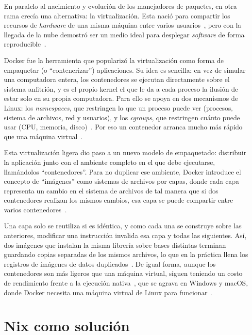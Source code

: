 En paralelo al nacimiento y evolución de los manejadores de paquetes, en otra rama crecía una alternativa: la virtualización. Esta nació para compartir los recursos de \emph{hardware} de una misma máquina entre varios usuarios~\cite{kozirisFiftyYearsEvolution2015}, pero con la llegada de la nube demostró ser un medio ideal para desplegar \emph{software} de forma reproducible~\cite{Sobieraj2024}.

Docker fue la herramienta que popularizó la virtualización como forma de empaquetar (o ``contenerizar'') aplicaciones. Su idea es sencilla: en vez de simular una computadora entera, los contenedores se ejecutan directamente sobre el sistema anfitrión, y es el propio kernel el que le da a cada proceso la ilusión de estar solo en su propia computadora. Para ello se apoya en dos mecanismos de Linux: los \emph{namespaces}, que restringen lo que un proceso puede ver (procesos, sistema de archivos, red y usuarios), y los \emph{cgroups}, que restringen cuánto puede usar (CPU, memoria, disco)~\cite{Sobieraj2024}. Por eso un contenedor arranca mucho más rápido que una máquina virtual~\cite{Lingayat2018}.

Esta virtualización ligera dio paso a un nuevo modelo de empaquetado: distribuir la aplicación junto con el ambiente completo en el que debe ejecutarse, llamándolos ``contenedores''. Para no duplicar ese ambiente, Docker introduce el concepto de ``imágenes'' como sistemas de archivos por capas, donde cada capa representa un cambio en el sistema de archivos de tal manera que si dos contenedores realizan los mismos cambios, esa capa se puede compartir entre varios contenedores~\cite{UnderstandingImageLayers}.

Una capa solo se reutiliza si es idéntica, y como cada una se construye sobre las anteriores, modificar una instrucción invalida esa capa y todas las siguientes. Así, dos imágenes que instalan la misma librería sobre bases distintas terminan guardando copias separadas de los mismos archivos, lo que en la práctica llena los registros de imágenes de datos duplicados~\cite{zhaoEndtoendHighperformanceDeduplication2024a}. De igual forma, aunque los contenedores son más ligeros que una máquina virtual, siguen teniendo un costo de rendimiento frente a la ejecución nativa~\cite{Giallorenzo2021}, que se agrava en Windows y macOS, donde Docker necesita una máquina virtual de Linux para funcionar~\cite{Sobieraj2024}.

\section{Nix como solución}

